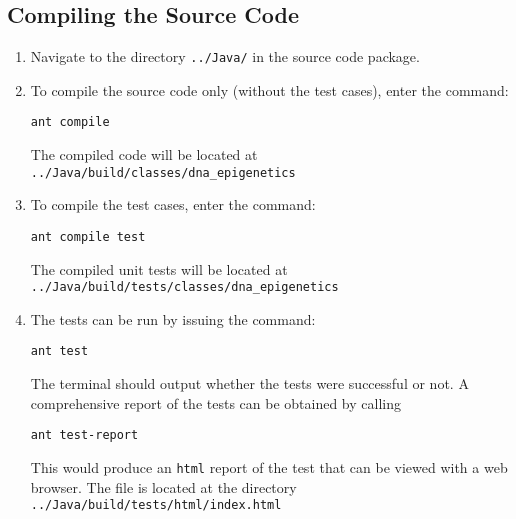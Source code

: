 \documentclass[12pt]{article}
\begin{document}
\subsection{Compiling the Source Code}
\begin{enumerate}
\item Navigate to the directory \texttt{../Java/} in the source code package.
\item To compile the source code only (without the test cases), enter the command:
\begin{lstlisting}
ant compile
\end{lstlisting}
The compiled code will be located at \texttt{../Java/build/classes/dna\_epigenetics}
\item To compile the test cases, enter the command:
\begin{lstlisting}
ant compile test
\end{lstlisting}
The compiled unit tests will be located at\\ \texttt{../Java/build/tests/classes/dna\_epigenetics}
\item The tests can be run by issuing the command:
\begin{lstlisting}
ant test
\end{lstlisting}
The terminal should output whether the tests were successful or not. A comprehensive report of the tests can be obtained by calling
\begin{lstlisting}
ant test-report
\end{lstlisting}
This would produce an \texttt{html} report of the test that can be viewed with a web browser. The file is located at the directory \texttt{../Java/build/tests/html/index.html}
\end{enumerate}
\end{document}
